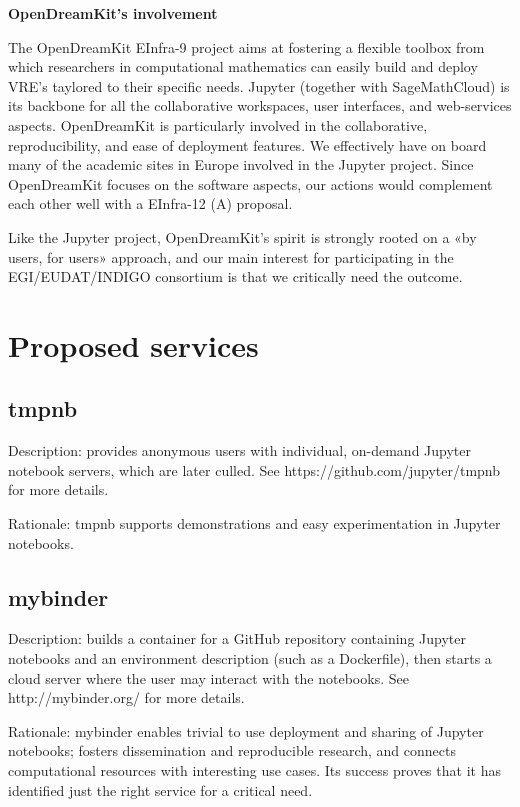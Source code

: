 \textbf{OpenDreamKit's involvement}

The OpenDreamKit EInfra-9 project aims at fostering a flexible toolbox
from which researchers in computational mathematics can easily build
and deploy VRE's taylored to their specific needs. Jupyter (together
with SageMathCloud) is its backbone for all the collaborative
workspaces, user interfaces, and web-services aspects. OpenDreamKit is
particularly involved in the collaborative, reproducibility, and ease
of deployment features. We effectively have on board many of the
academic sites in Europe involved in the Jupyter project. Since
OpenDreamKit focuses on the software aspects, our actions would
complement each other well with a EInfra-12 (A) proposal.

Like the Jupyter project, OpenDreamKit's spirit is strongly rooted on a «by users,
for users» approach, and our main interest for participating in the EGI/EUDAT/INDIGO consortium is that
we critically need the outcome.

\section{Proposed services}

\subsection{tmpnb}

Description: provides anonymous users with individual, on-demand Jupyter
notebook servers, which are later culled. See https://github.com/jupyter/tmpnb
for more details.

Rationale: tmpnb supports demonstrations and easy experimentation in
Jupyter notebooks.


\subsection{mybinder}

Description: builds a container for a GitHub repository containing Jupyter
notebooks and an environment description (such as a Dockerfile), then starts a
cloud server where the user may interact with the notebooks. See http://mybinder.org/
for more details.

Rationale: mybinder enables trivial to use deployment and sharing of
Jupyter notebooks; fosters dissemination and reproducible research,
and connects computational resources with interesting use cases.
Its success proves that it has identified just the right service for
a critical need.

